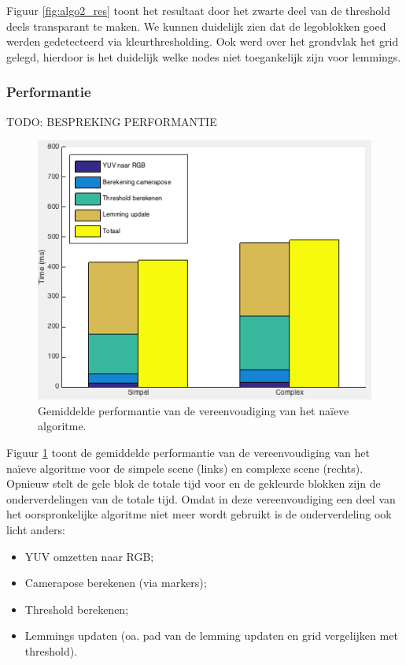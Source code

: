 Figuur \ref{fig:algo2_res} toont het resultaat door het zwarte deel van de threshold deels transparant te maken. We kunnen duidelijk zien dat de legoblokken goed werden gedetecteerd via kleurthresholding. Ook werd over het grondvlak het grid gelegd, hierdoor is het duidelijk welke nodes niet toegankelijk zijn voor lemmings.

\subsubsection*{Performantie}
TODO: BESPREKING PERFORMANTIE

\begin{figure}
  \centering
  \includegraphics[width=.75\linewidth]{img/naiveVereenvPerf}
  \caption{Gemiddelde performantie van de vereenvoudiging van het na\"ieve algoritme.}
  \label{fig:naive_vereenv_perf}
\end{figure}

Figuur \ref{fig:naive_vereenv_perf} toont de gemiddelde performantie van de vereenvoudiging van het na\"ieve algoritme voor de simpele scene (links) en complexe scene (rechts). Opnieuw stelt de gele blok de totale tijd voor en de gekleurde blokken zijn de onderverdelingen van de totale tijd. Omdat in deze vereenvoudiging een deel van het oorspronkelijke algoritme niet meer wordt gebruikt is de onderverdeling ook licht anders:
\begin{itemize}
\item YUV omzetten naar RGB;
\item Camerapose berekenen (via markers);
\item Threshold berekenen;
\item Lemmings updaten (oa. pad van de lemming updaten en grid vergelijken met threshold).
\end{itemize}

